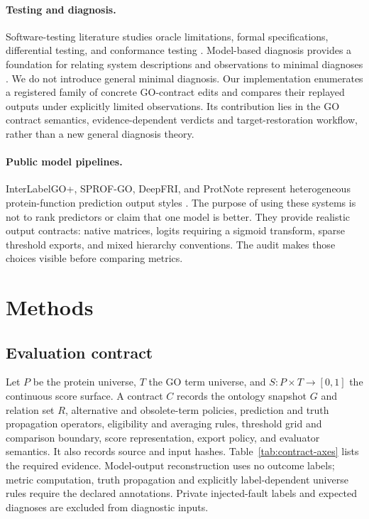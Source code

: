 \documentclass[11pt]{article}
\begin{document}
\paragraph{Testing and diagnosis.}
Software-testing literature studies oracle limitations, formal specifications, differential testing, and conformance testing \citep{barr2015oracle,hierons2009formaltesting}. Model-based diagnosis provides a foundation for relating system descriptions and observations to minimal diagnoses \citep{reiter1987diagnosis}. We do not introduce general minimal diagnosis. Our implementation enumerates a registered family of concrete GO-contract edits and compares their replayed outputs under explicitly limited observations. Its contribution lies in the GO contract semantics, evidence-dependent verdicts and target-restoration workflow, rather than a new general diagnosis theory.

\paragraph{Public model pipelines.}
InterLabelGO+, SPROF-GO, DeepFRI, and ProtNote represent heterogeneous protein-function prediction output styles \citep{liu2024interlabelgo,yuan2023sprofgo,gligorijevic2021deepfri,char2025protnote}. The purpose of using these systems is not to rank predictors or claim that one model is better. They provide realistic output contracts: native matrices, logits requiring a sigmoid transform, sparse threshold exports, and mixed hierarchy conventions. The audit makes those choices visible before comparing metrics.

\section{Methods}

\subsection{Evaluation contract}
Let $P$ be the protein universe, $T$ the GO term universe, and $S:P\times T\to[0,1]$ the continuous score surface. A contract $C$ records the ontology snapshot $G$ and relation set $R$, alternative and obsolete-term policies, prediction and truth propagation operators, eligibility and averaging rules, threshold grid and comparison boundary, score representation, export policy, and evaluator semantics. It also records source and input hashes. Table~\ref{tab:contract-axes} lists the required evidence. Model-output reconstruction uses no outcome labels; metric computation, truth propagation and explicitly label-dependent universe rules require the declared annotations. Private injected-fault labels and expected diagnoses are excluded from diagnostic inputs.
\end{document}

